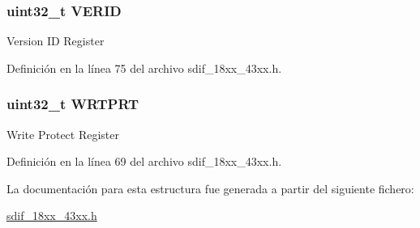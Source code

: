 \subsubsection[{\texorpdfstring{V\+E\+R\+ID}{VERID}}]{ uint32\+\_\+t V\+E\+R\+ID}\hypertarget{struct_l_p_c___s_d_m_m_c___t_ab20ff3f0387cbcc2652477ed5d2702df}{}\label{struct_l_p_c___s_d_m_m_c___t_ab20ff3f0387cbcc2652477ed5d2702df}
Version ID Register 

Definición en la línea 75 del archivo sdif\+\_\+18xx\+\_\+43xx.\+h.

\subsubsection[{\texorpdfstring{W\+R\+T\+P\+RT}{WRTPRT}}]{ uint32\+\_\+t W\+R\+T\+P\+RT}\hypertarget{struct_l_p_c___s_d_m_m_c___t_a900aa27c0e8e3d01ee671cfa37d04ed1}{}\label{struct_l_p_c___s_d_m_m_c___t_a900aa27c0e8e3d01ee671cfa37d04ed1}
Write Protect Register 

Definición en la línea 69 del archivo sdif\+\_\+18xx\+\_\+43xx.\+h.



La documentación para esta estructura fue generada a partir del siguiente fichero\+:\begin{DoxyCompactItemize}
\item 
\hyperlink{sdif__18xx__43xx_8h}{sdif\+\_\+18xx\+\_\+43xx.\+h}\end{DoxyCompactItemize}
